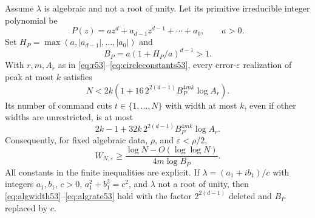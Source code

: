 \begin{theorem}\label{thm:algebraic53}
Assume $\lambda$ is algebraic and not a root of unity. Let its primitive irreducible integer polynomial be
\[
 P(z)=a z^d+a_{d-1}z^{d-1}+\cdots+a_0,\qquad a>0.
\]
Set $H_P=\max(a,|a_{d-1}|,\ldots,|a_0|)$ and
\[
                     B_P=a(1+H_P/a)^{d-1}>1.
\]
With $r,m,A_r$ as in \eqref{eq:r53}--\eqref{eq:circleconstants53}, every error-$\varepsilon$ realization of peak at most $k$ satisfies
\begin{equation}\label{eq:algwidth53}
 N<2k\left(1+16\,2^{2(d-1)}B_P^{4mk}\log A_r\right).
\end{equation}
Its number of command cuts $t\in\{1,\ldots,N\}$ with width at most $k$, even if other widths are unrestricted, is at most
\begin{equation}\label{eq:algoccupation53}
 2k-1+32k\,2^{2(d-1)}B_P^{4mk}\log A_r.
\end{equation}
Consequently, for fixed algebraic data, $\rho$, and $\varepsilon<\rho/2$,
\begin{equation}\label{eq:algrate53}
 W_{N,\varepsilon}\ge
 \frac{\log N-O(\log\log N)}{4m\log B_P}.
\end{equation}
All constants in the finite inequalities are explicit. If $\lambda=(a_1+ib_1)/c$ with integers $a_1,b_1$, $c>0$, $a_1^2+b_1^2=c^2$, and $\lambda$ not a root of unity, then \eqref{eq:algwidth53}--\eqref{eq:algrate53} hold with the factor $2^{2(d-1)}$ deleted and $B_P$ replaced by $c$.
\end{theorem}
